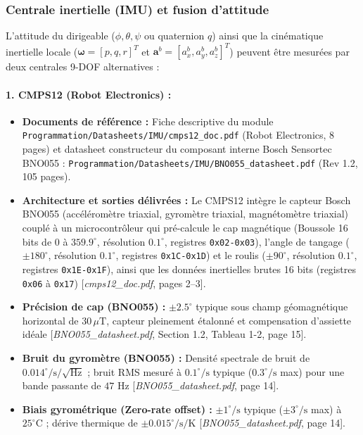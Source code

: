 \documentclass[../Formulations_Kalman.tex]{subfiles}
\begin{document}
\subsubsection{Centrale inertielle (IMU) et fusion d'attitude}
L'attitude du dirigeable ($\phi, \theta, \psi$ ou quaternion $q$) ainsi que la cinématique inertielle locale ($\boldsymbol{\omega} = [p, q, r]^T$ et $\mathbf{a}^b = [a_x^b, a_y^b, a_z^b]^T$) peuvent être mesurées par deux centrales 9-DOF alternatives :

\paragraph{1. CMPS12 (Robot Electronics) :}
\begin{itemize}
    \item \textbf{Documents de référence :} Fiche descriptive du module \texttt{Programmation/Datasheets/IMU/cmps12\_doc.pdf} (Robot Electronics, 8 pages) et datasheet constructeur du composant interne Bosch Sensortec BNO055 : \texttt{Programmation/Datasheets/IMU/BNO055\_datasheet.pdf} (Rev 1.2, 105 pages).
    \item \textbf{Architecture et sorties délivrées :} Le CMPS12 intègre le capteur Bosch BNO055 (accéléromètre triaxial, gyromètre triaxial, magnétomètre triaxial) couplé à un microcontrôleur qui pré-calcule le cap magnétique (Boussole 16 bits de $0$ à $359.9^\circ$, résolution $0.1^\circ$, registres \texttt{0x02-0x03}), l'angle de tangage ($\pm 180^\circ$, résolution $0.1^\circ$, registres \texttt{0x1C-0x1D}) et le roulis ($\pm 90^\circ$, résolution $0.1^\circ$, registres \texttt{0x1E-0x1F}), ainsi que les données inertielles brutes 16 bits (registres \texttt{0x06} à \texttt{0x17}) [\textit{cmps12\_doc.pdf}, pages 2--3].
    \item \textbf{Précision de cap (BNO055) :} $\pm 2.5^\circ$ typique sous champ géomagnétique horizontal de $30\,\mu\text{T}$, capteur pleinement étalonné et compensation d'assiette idéale [\textit{BNO055\_datasheet.pdf}, Section 1.2, Tableau 1-2, page 15].
    \item \textbf{Bruit du gyromètre (BNO055) :} Densité spectrale de bruit de $0.014^\circ/\text{s}/\sqrt{\text{Hz}}$ ; bruit RMS mesuré à $0.1^\circ/\text{s}$ typique ($0.3^\circ/\text{s}$ max) pour une bande passante de $47\text{ Hz}$ [\textit{BNO055\_datasheet.pdf}, page 14].
    \item \textbf{Biais gyrométrique (Zero-rate offset) :} $\pm 1^\circ/\text{s}$ typique ($\pm 3^\circ/\text{s}$ max) à $25^\circ\text{C}$ ; dérive thermique de $\pm 0.015^\circ/\text{s}/\text{K}$ [\textit{BNO055\_datasheet.pdf}, page 14].

\end{itemize}
\end{document}
